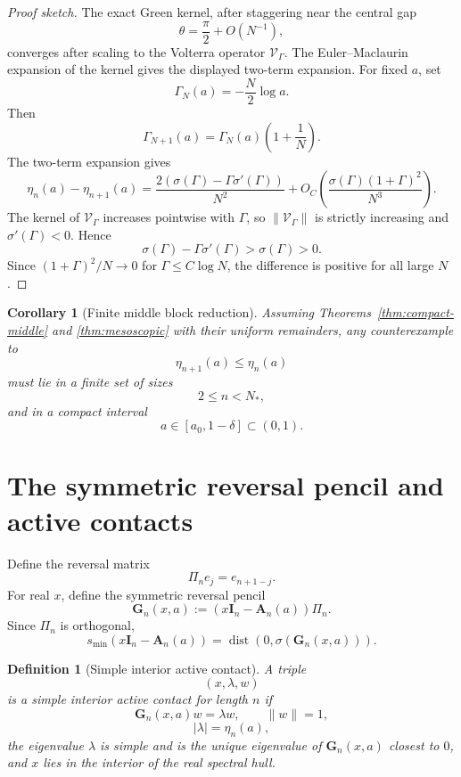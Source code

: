 \documentclass[11pt]{article}
\numberwithin{equation}{section}
\newtheorem{corollary}[theorem]{Corollary}
\newtheorem{definition}[theorem]{Definition}
\begin{document}
\begin{proof}[Proof sketch]
The exact Green kernel, after staggering near the central gap
\[
\theta=\frac{\pi}{2}+O(N^{-1}),
\]
converges after scaling to the Volterra operator \(\mathcal V_\Gamma\). The
Euler--Maclaurin expansion of the kernel gives the displayed two-term expansion.
For fixed \(a\), set
\[
\Gamma_N(a)=-\frac{N}{2}\log a.
\]
Then
\[
\Gamma_{N+1}(a)=\Gamma_N(a)\left(1+\frac1N\right).
\]
The two-term expansion gives
\[
\eta_n(a)-\eta_{n+1}(a)
=
\frac{2(\sigma(\Gamma)-\Gamma\sigma'(\Gamma))}{N^2}
+
O_C\!\left(
\frac{\sigma(\Gamma)(1+\Gamma)^2}{N^3}
\right).
\]
The kernel of \(\mathcal V_\Gamma\) increases pointwise with \(\Gamma\), so
\(\|\mathcal V_\Gamma\|\) is strictly increasing and \(\sigma'(\Gamma)<0\). Hence
\[
\sigma(\Gamma)-\Gamma\sigma'(\Gamma)>\sigma(\Gamma)>0.
\]
Since \((1+\Gamma)^2/N\to0\) for \(\Gamma\le C\log N\), the difference is positive
for all large \(N\).
\end{proof}

\begin{corollary}[Finite middle block reduction]
\label{cor:finite-block}
Assuming Theorems~\ref{thm:compact-middle} and \ref{thm:mesoscopic} with their
uniform remainders, any counterexample to
\[
\eta_{n+1}(a)\le\eta_n(a)
\]
must lie in a finite set of sizes
\[
2\le n<N_*,
\]
and in a compact interval
\[
a\in[a_0,1-\delta]\subset(0,1).
\]
\end{corollary}

\section{The symmetric reversal pencil and active contacts}

Define the reversal matrix
\[
\Pi_n e_j=e_{n+1-j}.
\]
For real \(x\), define the symmetric reversal pencil
\[
\mathbf G_n(x,a)
:=
(x\mathbf I_n-\mathbf A_n(a))\Pi_n.
\]
Since \(\Pi_n\) is orthogonal,
\[
s_{\min}(x\mathbf I_n-\mathbf A_n(a))
=
\operatorname{dist}(0,\sigma(\mathbf G_n(x,a))).
\]

\begin{definition}[Simple interior active contact]
A triple
\[
(x,\lambda,w)
\]
is a simple interior active contact for length \(n\) if
\[
\mathbf G_n(x,a)w=\lambda w,\qquad \|w\|=1,
\]
\[
|\lambda|=\eta_n(a),
\]
the eigenvalue \(\lambda\) is simple and is the unique eigenvalue of \(\mathbf G_n(x,a)\)
closest to \(0\), and \(x\) lies in the interior of the real spectral hull.
\end{definition}
\end{document}
